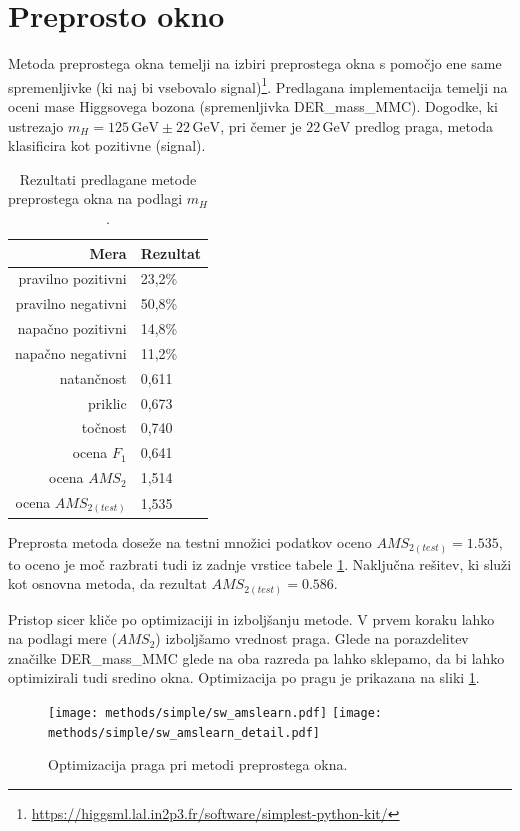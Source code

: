 \documentclass[11pt,a4paper,openany]{book}
\begin{document}
	
\section{Preprosto okno}

Metoda preprostega okna temelji na izbiri preprostega okna s pomočjo ene same spremenljivke (ki naj bi vsebovalo signal)\footnote{\url{https://higgsml.lal.in2p3.fr/software/simplest-python-kit/}}. Predlagana implementacija temelji na oceni mase Higgsovega bozona (spremenljivka DER\_mass\_MMC). Dogodke, ki ustrezajo $m_H = 125\,\text{GeV} \pm 22\,\text{GeV}$, pri čemer je $22\,\text{GeV}$ predlog praga, metoda klasificira kot pozitivne (signal).

\begin{table}[ht]
	\centering
	\begin{tabular}{rl}
		\hline
		\textbf{Mera} & \textbf{Rezultat} \\
		\hline
		pravilno pozitivni & 23,2\%\\
		pravilno negativni & 50,8\% \\
		napačno pozitivni & 14,8\% \\
		napačno negativni & 11,2\% \\
		natančnost & 0,611 \\
		priklic & 0,673 \\
		točnost & 0,740 \\
		ocena $F_1$ & 0,641 \\
		ocena $AMS_2$ & 1,514 \\
		ocena $AMS_{2(test)}$ & 1,535 		
	\end{tabular}
	\caption{Rezultati predlagane metode preprostega okna na podlagi $m_H$.}
	\label{tb:preprosto_okno}
\end{table}

Preprosta metoda doseže na testni množici podatkov oceno $AMS_{2(test)} = \num{1,535}$, to oceno je moč razbrati tudi iz zadnje vrstice tabele \ref{tb:preprosto_okno}. Naključna rešitev, ki služi kot osnovna metoda, da rezultat $AMS_{2{(test)}} = \num{0,586}$.

Pristop sicer kliče po optimizaciji in izboljšanju metode. V prvem koraku lahko na podlagi mere ($AMS_2$) izboljšamo vrednost praga. Glede na porazdelitev značilke DER\_mass\_MMC glede na oba razreda pa lahko sklepamo, da bi lahko optimizirali tudi sredino okna. Optimizacija po pragu je prikazana na sliki \ref{sl:simple_optimization_threshold}.

\begin{figure}[h]
	\centering	
	\texttt{[image: methods/simple/sw\_amslearn.pdf]}
	\texttt{[image: methods/simple/sw\_amslearn\_detail.pdf]}		
	
	\caption{Optimizacija praga pri metodi preprostega okna.}
	\label{sl:simple_optimization_threshold}
\end{figure}
\end{document}
